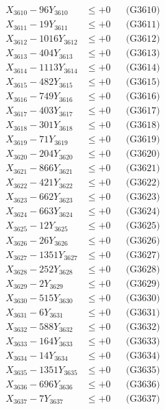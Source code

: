 \documentclass[a4paper,10pt]{article}
\begin{document}
{\begin{align}
X_{3610} - 96Y_{3610} &\leq +0 && \text{(G3610)} \\
\allowbreak
X_{3611} - 19Y_{3611} &\leq +0 && \text{(G3611)} \\
X_{3612} - 1016Y_{3612} &\leq +0 && \text{(G3612)} \\
X_{3613} - 404Y_{3613} &\leq +0 && \text{(G3613)} \\
X_{3614} - 1113Y_{3614} &\leq +0 && \text{(G3614)} \\
X_{3615} - 482Y_{3615} &\leq +0 && \text{(G3615)} \\
X_{3616} - 749Y_{3616} &\leq +0 && \text{(G3616)} \\
X_{3617} - 403Y_{3617} &\leq +0 && \text{(G3617)} \\
X_{3618} - 301Y_{3618} &\leq +0 && \text{(G3618)} \\
X_{3619} - 71Y_{3619} &\leq +0 && \text{(G3619)} \\
X_{3620} - 204Y_{3620} &\leq +0 && \text{(G3620)} \\
\allowbreak
X_{3621} - 866Y_{3621} &\leq +0 && \text{(G3621)} \\
X_{3622} - 421Y_{3622} &\leq +0 && \text{(G3622)} \\
X_{3623} - 662Y_{3623} &\leq +0 && \text{(G3623)} \\
X_{3624} - 663Y_{3624} &\leq +0 && \text{(G3624)} \\
X_{3625} - 12Y_{3625} &\leq +0 && \text{(G3625)} \\
X_{3626} - 26Y_{3626} &\leq +0 && \text{(G3626)} \\
X_{3627} - 1351Y_{3627} &\leq +0 && \text{(G3627)} \\
X_{3628} - 252Y_{3628} &\leq +0 && \text{(G3628)} \\
X_{3629} - 2Y_{3629} &\leq +0 && \text{(G3629)} \\
X_{3630} - 515Y_{3630} &\leq +0 && \text{(G3630)} \\
\allowbreak
X_{3631} - 6Y_{3631} &\leq +0 && \text{(G3631)} \\
X_{3632} - 588Y_{3632} &\leq +0 && \text{(G3632)} \\
X_{3633} - 164Y_{3633} &\leq +0 && \text{(G3633)} \\
X_{3634} - 14Y_{3634} &\leq +0 && \text{(G3634)} \\
X_{3635} - 1351Y_{3635} &\leq +0 && \text{(G3635)} \\
X_{3636} - 696Y_{3636} &\leq +0 && \text{(G3636)} \\
X_{3637} - 7Y_{3637} &\leq +0 && \text{(G3637)} \\

\end{align}}
\end{document}
